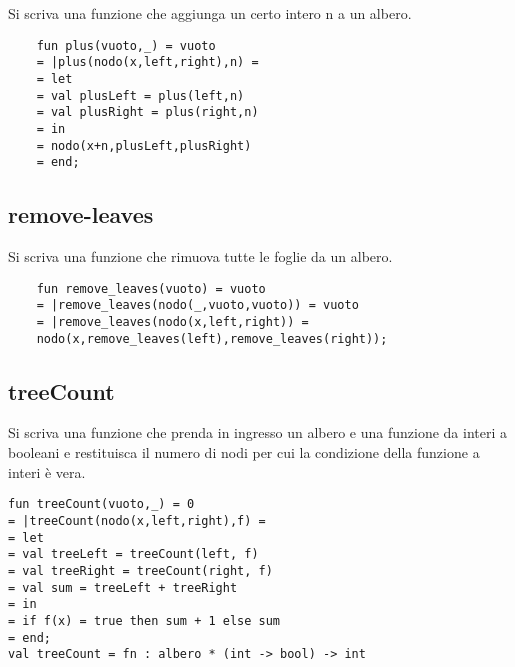 Si scriva una funzione che aggiunga un certo intero n a un albero.

\begin{lstlisting}
    fun plus(vuoto,_) = vuoto
    = |plus(nodo(x,left,right),n) =
    = let
    = val plusLeft = plus(left,n)
    = val plusRight = plus(right,n)
    = in
    = nodo(x+n,plusLeft,plusRight)
    = end;
\end{lstlisting}

\subsection{remove-leaves}

Si scriva una funzione che rimuova tutte le foglie da un albero.

\begin{lstlisting}
    fun remove_leaves(vuoto) = vuoto
    = |remove_leaves(nodo(_,vuoto,vuoto)) = vuoto
    = |remove_leaves(nodo(x,left,right)) = 
    nodo(x,remove_leaves(left),remove_leaves(right));
\end{lstlisting}

\subsection{treeCount}

Si scriva una funzione che prenda in ingresso un albero e una funzione da interi a booleani e restituisca il numero di nodi per cui la condizione della funzione a interi è vera.

\begin{lstlisting}
fun treeCount(vuoto,_) = 0
= |treeCount(nodo(x,left,right),f) =
= let
= val treeLeft = treeCount(left, f)
= val treeRight = treeCount(right, f)
= val sum = treeLeft + treeRight
= in
= if f(x) = true then sum + 1 else sum
= end;
val treeCount = fn : albero * (int -> bool) -> int
\end{lstlisting}